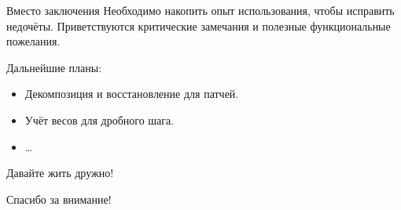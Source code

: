 \documentclass[xcolor={svgnames,table,hyperref},9pt]{beamer}
\begin{document}
\begin{frame}{Вместо заключения}
  Необходимо накопить опыт использования, чтобы исправить недочёты. Приветствуются критические замечания и полезные функциональные пожелания.
  
  \begin{block}{Дальнейшие планы:}\begin{itemize}
    \item Декомпозиция и восстановление для патчей.
    \item Учёт весов для дробного шага.
    \item \ldots
  \end{itemize}\end{block}
\end{frame}



\begin{frame}[standout]
  \begin{center}
    \huge Давайте жить дружно!
    
    \large Спасибо за внимание!
  \end{center}
\end{frame}
\end{document}
